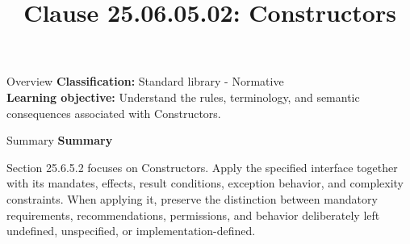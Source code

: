 \documentclass[10pt,letterpaper]{article}
\title{Clause 25.06.05.02: Constructors}
\author{}
\date{}
\begin{document}
\maketitle
\begin{CornellOverviewBox}{Overview}
\textbf{Classification:} Standard library - Normative\\[2pt]
\textbf{Learning objective:} Understand the rules, terminology, and semantic consequences associated with Constructors.
\end{CornellOverviewBox}\begin{CornellSummaryBox}{Summary}
{\sffamily\bfseries\color{Accent} Summary}\par\vspace{3pt}Section 25.6.5.2 focuses on Constructors. Apply the specified interface together with its mandates, effects, result conditions, exception behavior, and complexity constraints. When applying it, preserve the distinction between mandatory requirements, recommendations, permissions, and behavior deliberately left undefined, unspecified, or implementation-defined.
\end{CornellSummaryBox}
\end{document}
